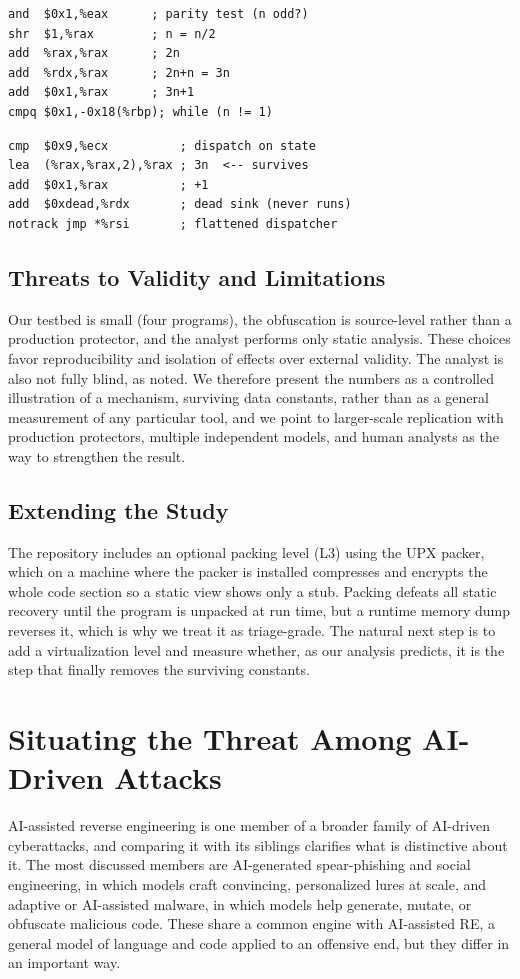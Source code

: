 \documentclass[conference]{IEEEtran}
\begin{document}
\begin{lstlisting}[style=asm,caption={P2 at L0: the algorithm is explicit.},label={lst:asm-l0}]
and  $0x1,%eax      ; parity test (n odd?)
shr  $1,%rax        ; n = n/2
add  %rax,%rax      ; 2n
add  %rdx,%rax      ; 2n+n = 3n
add  $0x1,%rax      ; 3n+1
cmpq $0x1,-0x18(%rbp); while (n != 1)
\end{lstlisting}

\begin{lstlisting}[style=asm,caption={P2 at L2: structure hidden, arithmetic survives.},label={lst:asm-l2}]
cmp  $0x9,%ecx          ; dispatch on state
lea  (%rax,%rax,2),%rax ; 3n  <-- survives
add  $0x1,%rax          ; +1
add  $0xdead,%rdx       ; dead sink (never runs)
notrack jmp *%rsi       ; flattened dispatcher
\end{lstlisting}

\subsection{Threats to Validity and Limitations}
Our testbed is small (four programs), the obfuscation is source-level rather than a
production protector, and the analyst performs only static analysis. These choices
favor reproducibility and isolation of effects over external validity. The analyst
is also not fully blind, as noted. We therefore present the numbers as a controlled
illustration of a mechanism, surviving data constants, rather than as a general
measurement of any particular tool, and we point to larger-scale replication with
production protectors, multiple independent models, and human analysts as the way to
strengthen the result.

\subsection{Extending the Study}
The repository includes an optional packing level (L3) using the UPX packer, which
on a machine where the packer is installed compresses and encrypts the whole code
section so a static view shows only a stub. Packing defeats all static recovery
until the program is unpacked at run time, but a runtime memory dump reverses it,
which is why we treat it as triage-grade. The natural next step is to add a
virtualization level and measure whether, as our analysis predicts, it is the step
that finally removes the surviving constants.

\section{Situating the Threat Among AI-Driven Attacks}
AI-assisted reverse engineering is one member of a broader family of AI-driven
cyberattacks, and comparing it with its siblings clarifies what is distinctive about
it. The most discussed members are AI-generated spear-phishing and social
engineering, in which models craft convincing, personalized lures at scale, and
adaptive or AI-assisted malware, in which models help generate, mutate, or obfuscate
malicious code. These share a common engine with AI-assisted RE, a general model of
language and code applied to an offensive end, but they differ in an important way.
\end{document}

